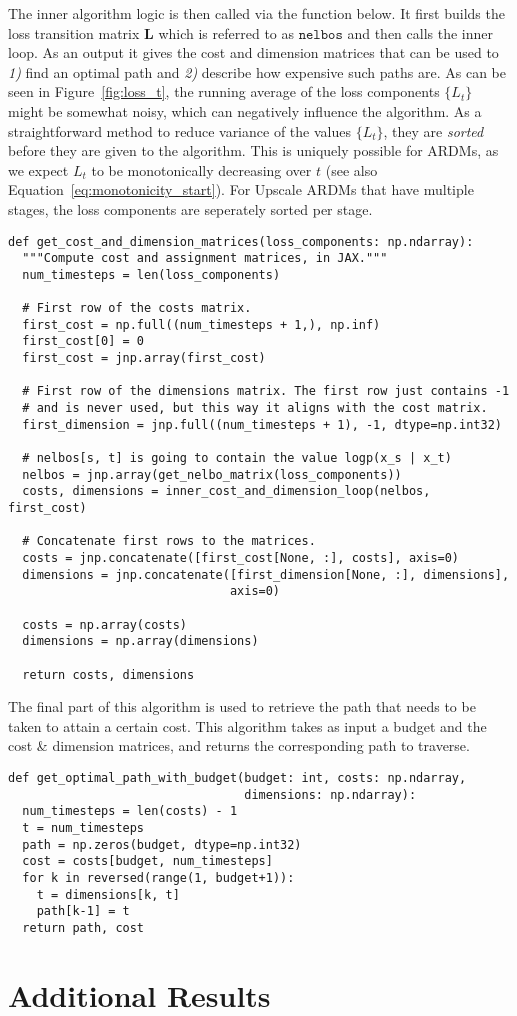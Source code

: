 \documentclass{article} \usepackage{iclr2022_conference,times}
\begin{document}
The inner algorithm logic is then called via the function below. It first builds the loss transition matrix $\mathbf{L}$ which is referred to as $\texttt{nelbos}$ and then calls the inner loop. As an output it gives the cost and dimension matrices that can be used to \textit{1)} find an optimal path and \textit{2)} describe how expensive such paths are. As can be seen in Figure~\ref{fig:loss_t}, the running average of the loss components $\{L_t\}$ might be somewhat noisy, which can negatively influence the algorithm. As a straightforward method to reduce variance of the values $\{L_t\}$, they are \textit{sorted} before they are given to the algorithm. This is uniquely possible for ARDMs, as we expect $L_t$ to be monotonically decreasing over $t$ (see also Equation~\ref{eq:monotonicity_start}). For Upscale ARDMs that have multiple stages, the loss components are seperately sorted per stage.
\begin{lstlisting}
def get_cost_and_dimension_matrices(loss_components: np.ndarray):
  """Compute cost and assignment matrices, in JAX."""
  num_timesteps = len(loss_components)

  # First row of the costs matrix.
  first_cost = np.full((num_timesteps + 1,), np.inf)
  first_cost[0] = 0
  first_cost = jnp.array(first_cost)

  # First row of the dimensions matrix. The first row just contains -1 
  # and is never used, but this way it aligns with the cost matrix.
  first_dimension = jnp.full((num_timesteps + 1), -1, dtype=np.int32)

  # nelbos[s, t] is going to contain the value logp(x_s | x_t)
  nelbos = jnp.array(get_nelbo_matrix(loss_components))
  costs, dimensions = inner_cost_and_dimension_loop(nelbos, first_cost)

  # Concatenate first rows to the matrices.
  costs = jnp.concatenate([first_cost[None, :], costs], axis=0)
  dimensions = jnp.concatenate([first_dimension[None, :], dimensions],
                               axis=0)

  costs = np.array(costs)
  dimensions = np.array(dimensions)

  return costs, dimensions
\end{lstlisting}

The final part of this algorithm is used to retrieve the path that needs to be taken to attain a certain cost. This algorithm takes as input a budget and the cost \& dimension matrices, and returns the corresponding path to traverse.
\begin{lstlisting}
def get_optimal_path_with_budget(budget: int, costs: np.ndarray,
                                 dimensions: np.ndarray):
  num_timesteps = len(costs) - 1
  t = num_timesteps
  path = np.zeros(budget, dtype=np.int32)
  cost = costs[budget, num_timesteps]
  for k in reversed(range(1, budget+1)):
    t = dimensions[k, t]
    path[k-1] = t
  return path, cost
\end{lstlisting} 
\newpage \section{Additional Results}
\end{document}
